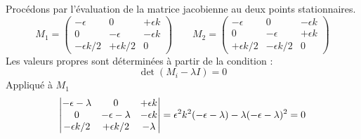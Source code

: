 Procédons par l'évaluation de la matrice jacobienne au deux points stationnaires.
%
\begin{equation}
    M_1 = \begin{pmatrix}
             -\epsilon & 0 & +\epsilon k \\
             0 & -\epsilon & -\epsilon k \\
            -\epsilon k/2 & +\epsilon k/2 & 0
         \end{pmatrix}
    \qquad
    M_2 = \begin{pmatrix}
             -\epsilon & 0 & -\epsilon k \\
             0 & -\epsilon & +\epsilon k \\
             +\epsilon k/2 & -\epsilon k/2 & 0
         \end{pmatrix}
\end{equation}
%
%
Les valeurs propres sont déterminées à partir de la condition :
%
\begin{dmath}
    \det(M_i - \lambda I)=0
\end{dmath}
%
Appliqué à $M_1$
%
\begin{dmath}
    \begin{vmatrix}
        -\epsilon - \lambda & 0 & +\epsilon k \\
        0 & -\epsilon - \lambda & -\epsilon k \\
        -\epsilon k/2 & +\epsilon k/2 & - \lambda
    \end{vmatrix}
    = \epsilon^2 k^2(-\epsilon - \lambda) - \lambda(-\epsilon - \lambda)^2 \\
    = 0
    \label{eq:coupled_charact_eq}
\end{dmath}
